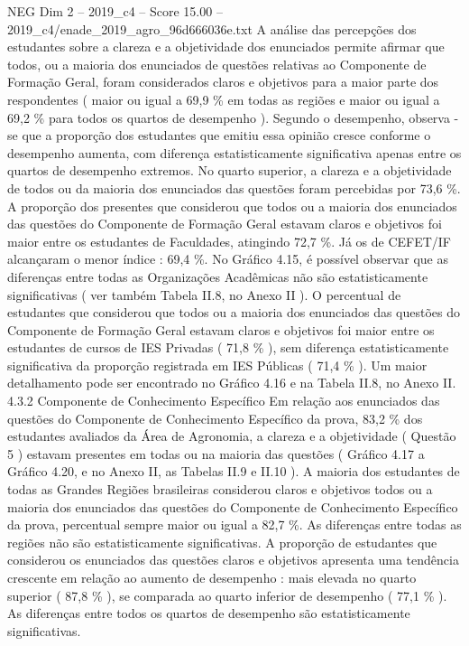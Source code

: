 \begin{textsample}{NEG Dim 2 – 2019\_c4 – Score 15.00 – 2019\_c4/enade\_2019\_agro\_96d666036e.txt}
A análise das percepções dos estudantes sobre a clareza e a objetividade dos enunciados permite afirmar que todos, ou a maioria dos enunciados de questões relativas ao Componente de Formação Geral, foram considerados claros e objetivos para a maior parte dos respondentes ( maior ou igual a 69,9 \% em todas as regiões e maior ou igual a 69,2 \% para todos os quartos de desempenho ).
Segundo o desempenho, observa -se que a proporção dos estudantes que emitiu essa opinião cresce conforme o desempenho aumenta, com diferença estatisticamente significativa apenas entre os quartos de desempenho extremos.
No quarto superior, a clareza e a objetividade de todos ou da maioria dos enunciados das questões foram percebidas por 73,6 \%.
A proporção dos presentes que considerou que todos ou a maioria dos enunciados das questões do Componente de Formação Geral estavam claros e objetivos foi maior entre os estudantes de Faculdades, atingindo 72,7 \%.
Já os de CEFET/IF alcançaram o menor índice : 69,4 \%.
No Gráfico 4.15, é possível observar que as diferenças entre todas as Organizações Acadêmicas não são estatisticamente significativas ( ver também Tabela II.8, no Anexo II ).
O percentual de estudantes que considerou que todos ou a maioria dos enunciados das questões do Componente de Formação Geral estavam claros e objetivos foi maior entre os estudantes de cursos de IES Privadas ( 71,8 \% ), sem diferença estatisticamente significativa da proporção registrada em IES Públicas ( 71,4 \% ).
Um maior detalhamento pode ser encontrado no Gráfico 4.16 e na Tabela II.8, no Anexo II. 4.3.2 Componente de Conhecimento Específico Em relação aos enunciados das questões do Componente de Conhecimento Específico da prova, 83,2 \% dos estudantes avaliados da Área de Agronomia, a clareza e a objetividade ( Questão 5 ) estavam presentes em todas ou na maioria das questões ( Gráfico 4.17 a Gráfico 4.20, e no Anexo II, as Tabelas II.9 e II.10 ).
A maioria dos estudantes de todas as Grandes Regiões brasileiras considerou claros e objetivos todos ou a maioria dos enunciados das questões do Componente de Conhecimento Específico da prova, percentual sempre maior ou igual a 82,7 \%.
As diferenças entre todas as regiões não são estatisticamente significativas.
A proporção de estudantes que considerou os enunciados das questões claros e objetivos apresenta uma tendência crescente em relação ao aumento de desempenho : mais elevada no quarto superior ( 87,8 \% ), se comparada ao quarto inferior de desempenho ( 77,1 \% ).
As diferenças entre todos os quartos de desempenho são estatisticamente significativas.

\end{textsample}
